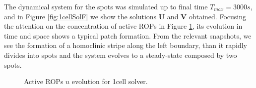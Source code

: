 The dynamical system for the spots was simulated up to final time $T_{max} = 3000s$, and in Figure \ref{fig:1cellSolF} we show the solutions $\mathbf{U}$ and $\mathbf{V}$ obtained. Focusing the attention on the concentration of active ROPs in Figure \ref{fig:1cellUevolution}, its evolution in time and space shows a typical patch formation. From the relevant snapshots, we see the formation of a homoclinic stripe along the left boundary, than it rapidly divides into spots and the system evolves to a steady-state composed by two spots.
\begin{figure}[H]
    \centering
    \quad
    \quad
    \quad
    \quad
    \quad
    \caption[1cell Active ROPs]{Active ROPs $u$ evolution for 1cell solver.}
    \label{fig:1cellUevolution}
\end{figure}






